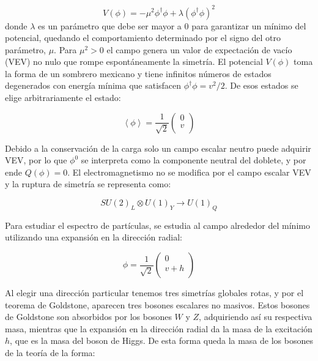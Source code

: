 \begin{equation}
	V(\phi) = - \mu^{2}\phi^{\dagger}\phi + \lambda(\phi^{\dagger}\phi)^{2}
\end{equation}
%
donde $\lambda$ es un parámetro que debe ser mayor a $0$ para garantizar un mínimo del potencial, quedando el comportamiento determinado por el signo del otro parámetro, $\mu$. Para $\mu^2>0$ el campo genera un valor de expectación de vacío (VEV) no nulo que rompe espontáneamente la simetría. El potencial $V(\phi)$ toma la forma de un sombrero mexicano  y tiene infinitos números de estados degenerados con energía mínima que satisfacen $\phi^{\dagger}\phi = v^2/2$. De esos estados se elige arbitrariamente el estado:

\begin{equation}
	\left<\phi\right> = \frac{1}{\sqrt{2}}
	\begin{pmatrix}
	0 \\
	v \\
	\end{pmatrix}
\end{equation}

Debido a la conservación de la carga solo un campo escalar neutro puede adquirir VEV, por lo que $\phi^0$ se interpreta como la componente neutral del doblete, y por ende $Q(\phi)=0$. El electromagnetismo no se modifica por el campo escalar VEV y la ruptura de simetría se representa como:

\begin{equation}
SU(2)_L \otimes U(1)_Y \rightarrow U(1)_Q
\end{equation}

Para estudiar el espectro de partículas, se estudia al campo alrededor del mínimo utilizando una expansión en la dirección radial:

\begin{equation}
	\phi = \frac{1}{\sqrt{2}}
	\begin{pmatrix}
	0 \\
	v + h \\
	\end{pmatrix}
\end{equation}

Al elegir una dirección particular tenemos tres simetrías globales rotas, y por el teorema de Goldstone, aparecen tres bosones escalares no masivos. Estos bosones de Goldstone son absorbidos por los bosones $W$ y $Z$, adquiriendo así su respectiva masa, mientras que la expansión en la dirección radial da la masa de la excitación $h$, que es la masa del boson de Higgs. De esta forma queda la masa de los bosones de la teoría de la forma:

